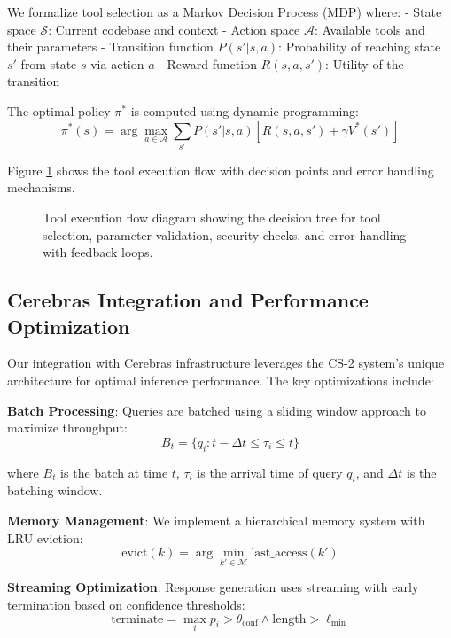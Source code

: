 \documentclass[10pt]{article}
\begin{document}
We formalize tool selection as a Markov Decision Process (MDP) where:
- State space $\mathcal{S}$: Current codebase and context
- Action space $\mathcal{A}$: Available tools and their parameters  
- Transition function $P(s'|s,a)$: Probability of reaching state $s'$ from state $s$ via action $a$
- Reward function $R(s,a,s')$: Utility of the transition

The optimal policy $\pi^*$ is computed using dynamic programming:
\begin{equation}
\pi^*(s) = \arg\max_{a \in \mathcal{A}} \sum_{s'} P(s'|s,a)[R(s,a,s') + \gamma V^*(s')]
\end{equation}

Figure \ref{fig:tool_flow} shows the tool execution flow with decision points and error handling mechanisms.

\begin{figure}[H]
\centering

\caption{Tool execution flow diagram showing the decision tree for tool selection, parameter validation, security checks, and error handling with feedback loops.}
\label{fig:tool_flow}
\end{figure}

\subsection{Cerebras Integration and Performance Optimization}

Our integration with Cerebras infrastructure leverages the CS-2 system's unique architecture for optimal inference performance. The key optimizations include:

\textbf{Batch Processing}: Queries are batched using a sliding window approach to maximize throughput:
\begin{equation}
B_t = \{q_i : t - \Delta t \leq \tau_i \leq t\}
\end{equation}

where $B_t$ is the batch at time $t$, $\tau_i$ is the arrival time of query $q_i$, and $\Delta t$ is the batching window.

\textbf{Memory Management}: We implement a hierarchical memory system with LRU eviction:
\begin{equation}
\text{evict}(k) = \arg\min_{k' \in \mathcal{M}} \text{last\_access}(k')
\end{equation}

\textbf{Streaming Optimization}: Response generation uses streaming with early termination based on confidence thresholds:
\begin{equation}
\text{terminate} = \max_{i} p_i > \theta_{\text{conf}} \land \text{length} > \ell_{\text{min}}
\end{equation}
\end{document}
